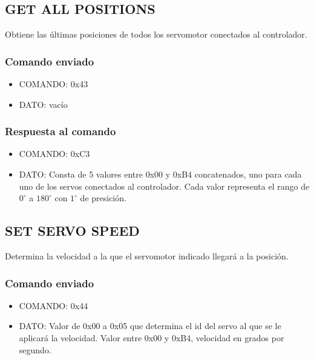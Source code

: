 \documentclass[a4paper,10pt]{article}
\begin{document}
\subsection{GET ALL POSITIONS}
\label{get_all_positions}

Obtiene las \'ultimas posiciones de todos los servomotor conectados al controlador.

\subsubsection*{Comando enviado}

\begin{itemize}
	\item{COMANDO:} 0x43
	\item{DATO:} vac\'io
\end{itemize}

\subsubsection*{Respuesta al comando}

\begin{itemize}
	\item{COMANDO:} 0xC3
	\item{DATO:} Consta de 5 valores entre 0x00 y 0xB4 concatenados, uno para cada uno de los servos conectados al controlador.
	Cada valor representa el rango de $0^{\circ}$ a $180^{\circ}$ con $1^{\circ}$ de presici\'on.
\end{itemize}

\subsection{SET SERVO SPEED}
\label{set_servo_speed}

Determina la velocidad a la que el servomotor indicado llegar\'a a la posici\'on.

\subsubsection*{Comando enviado}

\begin{itemize}
	\item{COMANDO:} 0x44
	\item{DATO:} Valor de 0x00 a 0x05 que determina el id del servo al que se le aplicar\'a la velocidad.
	Valor entre 0x00 y 0xB4, velocidad en grados por segundo.
\end{itemize}
\end{document}

